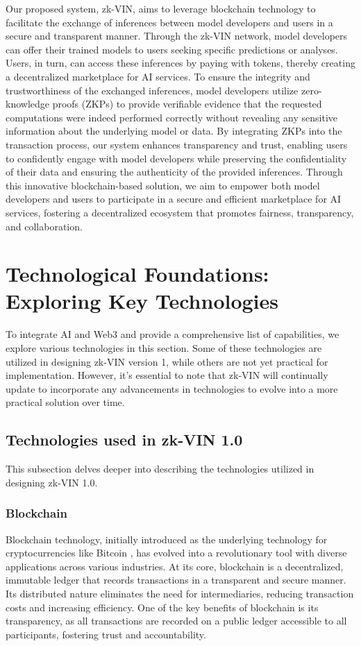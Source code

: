 \documentclass[conference]{IEEEtran}
\begin{document}
Our proposed system, zk-VIN, aims to leverage blockchain technology to facilitate the exchange of inferences between model developers and users in a secure and transparent manner. Through the zk-VIN network, model developers can offer their trained models to users seeking specific predictions or analyses. Users, in turn, can access these inferences by paying with tokens, thereby creating a decentralized marketplace for AI services. To ensure the integrity and trustworthiness of the exchanged inferences, model developers utilize zero-knowledge proofs (ZKPs) to provide verifiable evidence that the requested computations were indeed performed correctly without revealing any sensitive information about the underlying model or data. By integrating ZKPs into the transaction process, our system enhances transparency and trust, enabling users to confidently engage with model developers while preserving the confidentiality of their data and ensuring the authenticity of the provided inferences. Through this innovative blockchain-based solution, we aim to empower both model developers and users to participate in a secure and efficient marketplace for AI services, fostering a decentralized ecosystem that promotes fairness, transparency, and collaboration.

\section{Technological Foundations: Exploring Key Technologies}
To integrate AI and Web3 and provide a comprehensive list of capabilities, we explore various technologies in this section. Some of these technologies are utilized in designing zk-VIN version 1, while others are not yet practical for implementation. However, it's essential to note that zk-VIN will continually update to incorporate any advancements in technologies to evolve into a more practical solution over time.

\subsection{Technologies used in zk-VIN 1.0}

This subsection delves deeper into describing the technologies utilized in designing zk-VIN 1.0.

\subsubsection{Blockchain}
Blockchain technology, initially introduced as the underlying technology for cryptocurrencies like Bitcoin \cite{Nakamoto2008BitcoinPeerToPeer}, has evolved into a revolutionary tool with diverse applications across various industries. At its core, blockchain is a decentralized, immutable ledger that records transactions in a transparent and secure manner. Its distributed nature eliminates the need for intermediaries, reducing transaction costs and increasing efficiency. One of the key benefits of blockchain is its transparency, as all transactions are recorded on a public ledger accessible to all participants, fostering trust and accountability.
\end{document}
